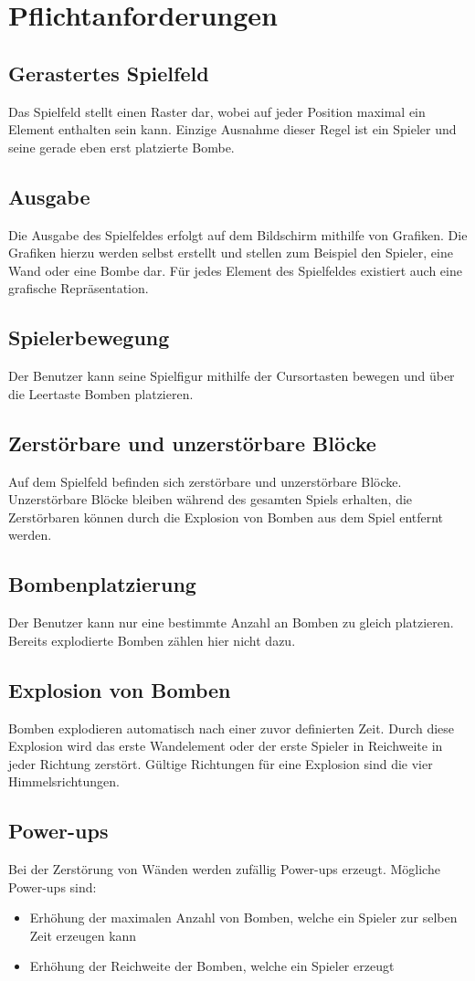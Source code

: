 \documentclass[12pt]{article}
\begin{document}
\section{Pflichtanforderungen}
\subsection{Gerastertes Spielfeld}
Das Spielfeld stellt einen Raster dar, wobei auf jeder Position maximal ein Element enthalten sein kann. Einzige Ausnahme dieser Regel ist ein Spieler und seine gerade eben erst platzierte Bombe.
\subsection{Ausgabe}
Die Ausgabe des Spielfeldes erfolgt auf dem Bildschirm mithilfe von Grafiken. Die Grafiken hierzu werden selbst erstellt und stellen zum Beispiel den Spieler, eine Wand oder eine Bombe dar. Für jedes Element des Spielfeldes existiert auch eine grafische Repräsentation.
\subsection{Spielerbewegung}
Der Benutzer kann seine Spielfigur mithilfe der Cursortasten bewegen und über die Leertaste Bomben platzieren.
\subsection{Zerstörbare und unzerstörbare Blöcke}
Auf dem Spielfeld befinden sich zerstörbare und unzerstörbare Blöcke. Unzerstörbare Blöcke bleiben während des gesamten Spiels erhalten, die Zerstörbaren können durch die Explosion von Bomben aus dem Spiel entfernt werden.
\subsection{Bombenplatzierung}
Der Benutzer kann nur eine bestimmte Anzahl an Bomben zu gleich platzieren. Bereits explodierte Bomben zählen hier nicht dazu.
\subsection{Explosion von Bomben}
Bomben explodieren automatisch nach einer zuvor definierten Zeit. Durch diese Explosion wird das erste Wandelement oder der erste Spieler in Reichweite in jeder Richtung zerstört. Gültige Richtungen für eine Explosion sind die vier Himmelsrichtungen.
\subsection{Power-ups}
Bei der Zerstörung von Wänden werden zufällig Power-ups erzeugt. Mögliche Power-ups sind: 
\begin{itemize}
	\item Erhöhung der maximalen Anzahl von Bomben, welche ein Spieler zur selben Zeit erzeugen kann
	\item Erhöhung der Reichweite der Bomben, welche ein Spieler erzeugt
\end{itemize}
\end{document}

